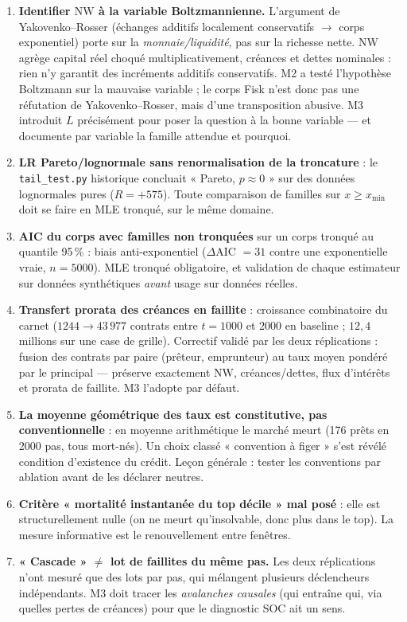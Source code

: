 \documentclass[11pt,a4paper]{article}
\newcommand{\NW}{\mathrm{NW}}
\newcommand{\code}[1]{\texttt{#1}}
\begin{document}
\begin{enumerate}[leftmargin=1.6em, itemsep=3pt]
\item \textbf{Identifier $\NW$ à la variable Boltzmannienne.} L'argument de
  Yakovenko--Rosser (échanges additifs localement conservatifs $\to$ corps
  exponentiel) porte sur la \emph{monnaie/liquidité}, pas sur la richesse
  nette. $\NW$ agrège capital réel choqué multiplicativement, créances et
  dettes nominales : rien n'y garantit des incréments additifs conservatifs.
  M2 a testé l'hypothèse Boltzmann sur la mauvaise variable ; le corps Fisk
  n'est donc pas une réfutation de Yakovenko--Rosser, mais d'une transposition
  abusive. M3 introduit $L$ précisément pour poser la question à la bonne
  variable --- et documente par variable la famille attendue et pourquoi.
\item \textbf{LR Pareto/lognormale sans renormalisation de la troncature} :
  le \code{tail\_test.py} historique concluait « Pareto, $p \approx 0$ » sur
  des données lognormales pures ($R = +575$). Toute comparaison de familles
  sur $x \ge x_{\min}$ doit se faire en MLE tronqué, sur le même domaine.
\item \textbf{AIC du corps avec familles non tronquées} sur un corps tronqué
  au quantile 95\,\% : biais anti-exponentiel ($\Delta$AIC $= 31$ contre une
  exponentielle vraie, $n = 5000$). MLE tronqué obligatoire, et validation de
  chaque estimateur sur données synthétiques \emph{avant} usage sur données
  réelles.
\item \textbf{Transfert prorata des créances en faillite} : croissance
  combinatoire du carnet ($1244 \to 43\,977$ contrats entre $t=1000$ et $2000$
  en baseline ; $12{,}4$ millions sur une case de grille). Correctif validé
  par les deux réplications : fusion des contrats par paire
  (prêteur, emprunteur) au taux moyen pondéré par le principal --- préserve
  exactement $\NW$, créances/dettes, flux d'intérêts et prorata de faillite.
  M3 l'adopte par défaut.
\item \textbf{La moyenne géométrique des taux est constitutive, pas
  conventionnelle} : en moyenne arithmétique le marché meurt (176 prêts en
  2000 pas, tous mort-nés). Un choix classé « convention à figer » s'est révélé
  condition d'existence du crédit. Leçon générale : tester les conventions par
  ablation avant de les déclarer neutres.
\item \textbf{Critère « mortalité instantanée du top décile » mal posé} : elle
  est structurellement nulle (on ne meurt qu'insolvable, donc plus dans le
  top). La mesure informative est le renouvellement entre fenêtres.
\item \textbf{« Cascade » $\ne$ lot de faillites du même pas.} Les deux
  réplications n'ont mesuré que des lots par pas, qui mélangent plusieurs
  déclencheurs indépendants. M3 doit tracer les \emph{avalanches causales}
  (qui entraîne qui, via quelles pertes de créances) pour que le diagnostic
  SOC ait un sens.
\end{enumerate}
\end{document}

